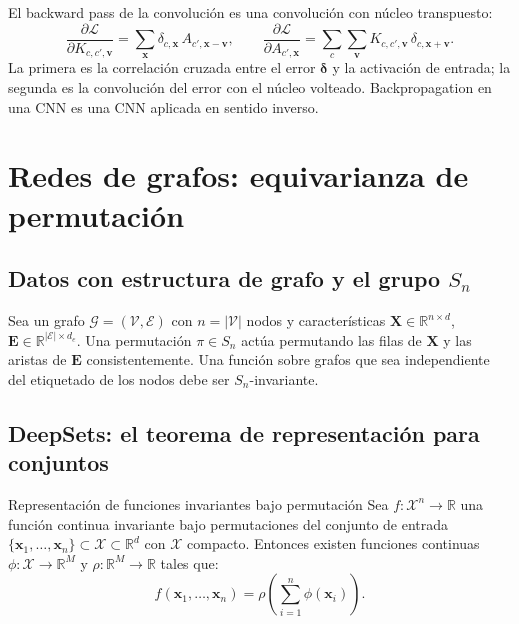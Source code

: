 El backward pass de la convolución es una convolución con núcleo transpuesto:
\[
  \frac{\partial\mathcal{L}}{\partial K_{c,c',\bm{v}}}
  = \sum_{\bm{x}} \delta_{c,\bm{x}}\,A_{c',\bm{x}-\bm{v}},
  \qquad
  \frac{\partial\mathcal{L}}{\partial A_{c',\bm{x}}}
  = \sum_c \sum_{\bm{v}} K_{c,c',\bm{v}}\,\delta_{c,\bm{x}+\bm{v}}.
\]
La primera es la correlación cruzada entre el error $\bm{\delta}$ y la activación
de entrada; la segunda es la convolución del error con el núcleo volteado.
Backpropagation en una CNN es una CNN aplicada en sentido inverso.

\section{Redes de grafos: equivarianza de permutación}
\label{sec:gnn}

\subsection{Datos con estructura de grafo y el grupo $S_n$}
\label{subsec:datos_grafo}

Sea un grafo $\mathcal{G} = (\mathcal{V}, \mathcal{E})$ con $n = |\mathcal{V}|$
nodos y características $\bm{X} \in \mathbb{R}^{n \times d}$,
$\bm{E} \in \mathbb{R}^{|\mathcal{E}| \times d_e}$. Una permutación
$\pi \in S_n$ actúa permutando las filas de $\bm{X}$ y las aristas de
$\bm{E}$ consistentemente. Una función sobre grafos que sea independiente
del etiquetado de los nodos debe ser $S_n$-invariante.

\subsection{DeepSets: el teorema de representación para conjuntos}
\label{subsec:deepsets}

\begin{teorema}{Representación de funciones invariantes bajo permutación}
\label{thm:deepsets}
Sea $f: \mathcal{X}^n \to \mathbb{R}$ una función continua invariante bajo
permutaciones del conjunto de entrada $\{\bm{x}_1,\ldots,\bm{x}_n\} \subset
\mathcal{X} \subset \mathbb{R}^d$ con $\mathcal{X}$ compacto. Entonces existen
funciones continuas $\phi: \mathcal{X} \to \mathbb{R}^M$ y
$\rho: \mathbb{R}^M \to \mathbb{R}$ tales que:
\[
  f(\bm{x}_1,\ldots,\bm{x}_n)
  = \rho\!\left(\sum_{i=1}^n \phi(\bm{x}_i)\right).
\]
\end{teorema}

